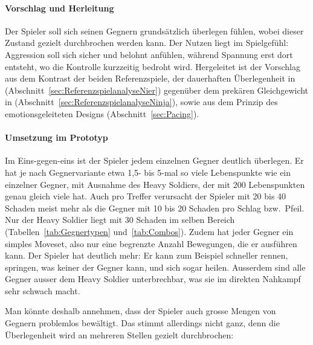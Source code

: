 \documentclass[../Main.tex]{subfiles}
\begin{document}
\paragraph{Vorschlag und Herleitung}
Der Spieler soll sich seinen Gegnern grundsätzlich überlegen fühlen, wobei dieser Zustand gezielt durchbrochen werden kann. Der Nutzen liegt im Spielgefühl: Aggression soll sich sicher und belohnt anfühlen, während Spannung erst dort entsteht, wo die Kontrolle kurzzeitig bedroht wird. Hergeleitet ist der Vorschlag aus dem Kontrast der beiden Referenzspiele, der dauerhaften Überlegenheit in  (Abschnitt~\ref{sec:ReferenzspielanalyseNier}) gegenüber dem prekären Gleichgewicht in  (Abschnitt~\ref{sec:ReferenzspielanalyseNinja}), sowie aus dem Prinzip des emotionsgeleiteten Designs (Abschnitt~\ref{sec:Pacing}).

\paragraph{Umsetzung im Prototyp}
Im Eins-gegen-eins ist der Spieler jedem einzelnen Gegner deutlich überlegen. Er hat je nach Gegnervariante etwa 1,5- bis 5-mal so viele Lebenspunkte wie ein einzelner Gegner, mit Ausnahme des Heavy Soldiers, der mit 200 Lebenspunkten genau gleich viele hat. Auch pro Treffer verursacht der Spieler mit 20 bis 40 Schaden meist mehr als die Gegner mit 10 bis 20 Schaden pro Schlag bzw.\ Pfeil. Nur der Heavy Soldier liegt mit 30 Schaden im selben Bereich (Tabellen~\ref{tab:Gegnertypen} und~\ref{tab:Combos}). Zudem hat jeder Gegner ein simples Moveset, also nur eine begrenzte Anzahl Bewegungen, die er ausführen kann. Der Spieler hat deutlich mehr: Er kann zum Beispiel schneller rennen, springen, was keiner der Gegner kann, und sich sogar heilen. Ausserdem sind alle Gegner ausser dem Heavy Soldier unterbrechbar, was sie im direkten Nahkampf sehr schwach macht.

Man könnte deshalb annehmen, dass der Spieler auch grosse Mengen von Gegnern problemlos bewältigt. Das stimmt allerdings nicht ganz, denn die Überlegenheit wird an mehreren Stellen gezielt durchbrochen:
\end{document}
